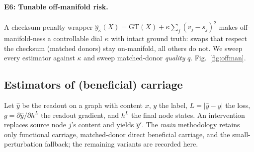\paragraph{E6: Tunable off-manifold risk.}
A checksum-penalty wrapper $\hat y_\kappa(X)=\mathrm{GT}(X)+\kappa\sum_j (v_j-s_j)^2$ makes
off-manifold-ness a controllable dial $\kappa$ with intact ground truth: swaps that respect the
checksum (matched donors) stay on-manifold, all others do not. We sweep every estimator against
$\kappa$ and sweep matched-donor \emph{quality} $q$. Fig.~\ref{fig:offman}.

\subsection{Estimators of (beneficial) carriage}
\label{app:estimators}
Let $\hat y$ be the readout on a graph with content $x$, $y$ the label, $L=|\hat y-y|$ the loss,
$g=\partial\hat y/\partial h^{L}$ the readout gradient, and $h^{L}$ the final node states. An
intervention replaces source node $j$'s content and yields $\hat y'$. The \emph{main} methodology
retains only functional carriage, matched-donor direct beneficial carriage, and the
small-perturbation fallback; the remaining variants are recorded here.


